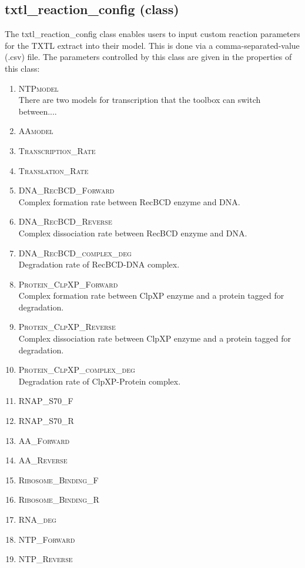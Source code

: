 \documentclass[english]{report}
\begin{document}
		\subsection*{txtl\_reaction\_config (class)}
		The txtl\_reaction\_config class enables users to input custom reaction parameters for the TXTL extract into their model. This is done via a comma-separated-value (.csv) file. The parameters controlled by this class are given in the properties of this class:
			\begin{enumerate}
			\item \textsc{NTPmodel} \\
			There are two models for transcription that the toolbox can switch between....
        	\item \textsc{AAmodel}
        	\item \textsc{Transcription\_Rate}
        	\item \textsc{Translation\_Rate}
        	\item \textsc{DNA\_RecBCD\_Forward} \\
        	Complex formation rate between RecBCD enzyme and DNA.        	
        	\item \textsc{DNA\_RecBCD\_Reverse} \\
        	Complex dissociation rate between RecBCD enzyme and DNA. 
        	\item \textsc{DNA\_RecBCD\_complex\_deg} \\
        	Degradation rate of RecBCD-DNA complex.
        	\item \textsc{Protein\_ClpXP\_Forward} \\
        	Complex formation rate between ClpXP enzyme and a protein tagged for degradation.
        	\item \textsc{Protein\_ClpXP\_Reverse} \\
        	Complex dissociation rate between ClpXP enzyme and a protein tagged for degradation.
        	\item \textsc{Protein\_ClpXP\_complex\_deg} \\
        	Degradation rate of ClpXP-Protein complex.
        	\item \textsc{RNAP\_S70\_F}
        	\item \textsc{RNAP\_S70\_R}
        	\item \textsc{AA\_Forward}
        	\item \textsc{AA\_Reverse}
        	\item \textsc{Ribosome\_Binding\_F}
        	\item \textsc{Ribosome\_Binding\_R}
        	\item \textsc{RNA\_deg}
        	\item \textsc{NTP\_Forward}
        	\item \textsc{NTP\_Reverse}
			\end{enumerate}		
\end{document}
